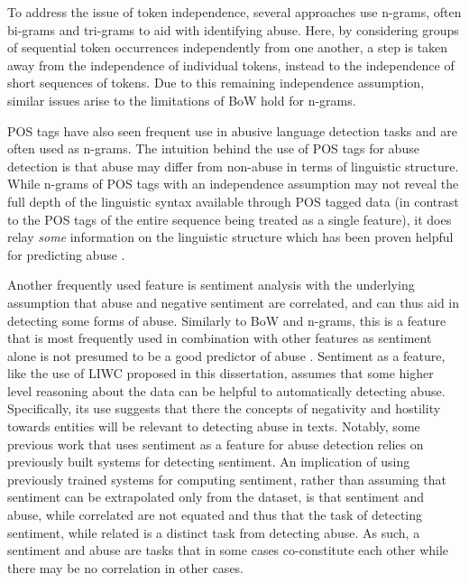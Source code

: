 To address the issue of token independence, several approaches use n-grams, often bi-grams \citep{Waseem:2016} and tri-grams \citep{Davidson:2017} to aid with identifying abuse. Here, by considering groups of sequential token occurrences independently from one another, a step is taken away from the independence of individual tokens, instead to the independence of short sequences of tokens. Due to this remaining independence assumption, similar issues arise to the limitations of BoW hold for n-grams.

POS tags have also seen frequent use in abusive language detection tasks \citep{Fortuna:2018} and are often used as n-grams. The intuition behind the use of POS tags for abuse detection is that abuse may differ from non-abuse in terms of linguistic structure. While n-grams of POS tags with an independence assumption may not reveal the full depth of the linguistic syntax available through POS tagged data (in contrast to the POS tags of the entire sequence being treated as a single feature), it does relay \textit{some} information on the linguistic structure which has been proven helpful for predicting abuse \citep{Fortuna:2018}.

Another frequently used feature is sentiment analysis \citep{Fortuna:2018} with the underlying assumption that abuse and negative sentiment are correlated, and can thus aid in detecting some forms of abuse. Similarly to BoW and n-grams, this is a feature that is most frequently used in combination with other features as sentiment alone is not presumed to be a good predictor of abuse \citep{Fortuna:2018}. Sentiment as a feature, like the use of LIWC proposed in this dissertation, assumes that some higher level reasoning about the data can be helpful to automatically detecting abuse. Specifically, its use suggests that there the concepts of negativity and hostility towards entities will be relevant to detecting abuse in texts. Notably, some previous work that uses sentiment as a feature for abuse detection \citep{Davidson:2017} relies on previously built systems for detecting sentiment. An implication of using previously trained systems for computing sentiment, rather than assuming that sentiment can be extrapolated only from the dataset, is that sentiment and abuse, while correlated are not equated and thus that the task of detecting sentiment, while related is a distinct task from detecting abuse. As such, a sentiment and abuse are tasks that in some cases co-constitute each other while there may be no correlation in other cases.

